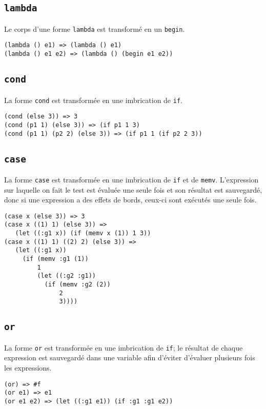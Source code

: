 \documentclass[10pt]{report}
\begin{document}
\subsection{\tt lambda}

Le corps d'une forme {\tt lambda} est transformé en un {\tt begin}.

\begin{verbatim}
(lambda () e1) => (lambda () e1)
(lambda () e1 e2) => (lambda () (begin e1 e2))
\end{verbatim}


\subsection{\tt cond}

La forme {\tt cond} est transformée en une imbrication de {\tt if}.


\begin{verbatim}
(cond (else 3)) => 3
(cond (p1 1) (else 3)) => (if p1 1 3)
(cond (p1 1) (p2 2) (else 3)) => (if p1 1 (if p2 2 3))
\end{verbatim}


\subsection{\tt case}

La forme {\tt case} est transformée en une imbrication de {\tt if} et
de {\tt memv}. L'expression sur laquelle on fait le test est évaluée
une seule fois et son résultat est sauvegardé, donc si une expression
a des effets de bords, ceux-ci sont exécutés une seule fois.


\begin{verbatim}
(case x (else 3)) => 3
(case x ((1) 1) (else 3)) =>
   (let ((:g1 x)) (if (memv x (1)) 1 3))
(case x ((1) 1) ((2) 2) (else 3)) =>
   (let ((:g1 x))
     (if (memv :g1 (1))
         1
         (let ((:g2 :g1))
           (if (memv :g2 (2))
               2
               3))))
\end{verbatim}

\subsection{\tt or}

La forme {\tt or} est transformée en une imbrication de {\tt if}; le
résultat de chaque expression est sauvegardé dans une variable afin
d'éviter d'évaluer plusieurs fois les expressions.


\begin{verbatim}
(or) => #f
(or e1) => e1
(or e1 e2) => (let ((:g1 e1)) (if :g1 :g1 e2))
\end{verbatim}
\end{document}
